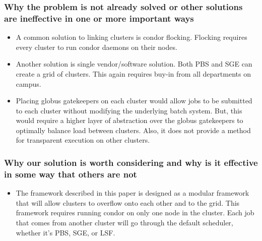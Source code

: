 \documentclass[11pt]{article}
\begin{document}
\subsubsection* {Why the problem is not already solved or other solutions 
are ineffective in one or more important ways}

\begin{itemize}

\item 
A common solution to linking clusters is condor flocking.  Flocking requires every cluster to run condor daemons on their nodes.  

\item
Another solution is single vendor/software solution.  Both PBS and SGE can create a grid of clusters.  This again requires buy-in from all departments on campus.

\item
Placing globus gatekeepers on each cluster would allow jobs to be submitted to each cluster without modifying the underlying batch system.  But, this would require a higher layer of abstraction over the globus gatekeepers to optimally balance load between clusters.  Also, it does not provide a method for transparent execution on other clusters.



\end{itemize}


\subsubsection* {Why our solution is worth considering and why is it effective
in some way that others are not}

\begin{itemize}
\item The framework described in this paper is designed as a modular framework that will allow clusters to overflow onto each other and to the grid.  This framework requires running condor on only one node in the cluster.  Each job that comes from another cluster will go through the default scheduler, whether it's PBS, SGE, or LSF.


\end{itemize}
\end{document}

